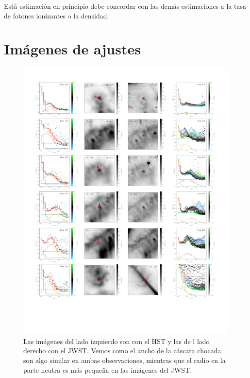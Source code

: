 \documentclass{book}
\begin{document}
Está estimación en principio debe concordar con las demás estimaciones a la tasa de fotones ionizantes o la densidad.

\chapter{Imágenes de ajustes}

\begin{figure}[htb]
    \centering
    \includegraphics[width=\textwidth]{imagenes Chapter 4/ajustes_075324-1.pdf}
    \caption{Las imágenes del lado izquierdo son con el HST y las de l lado derecho con el JWST. Vemos como el ancho de la cáscara chocada son algo similar en ambas observaciones, mientras que el radio en la parte neutra es más pequeña en las imágenes del JWST.}
    \label{GooG}
\end{figure}
\end{document}
